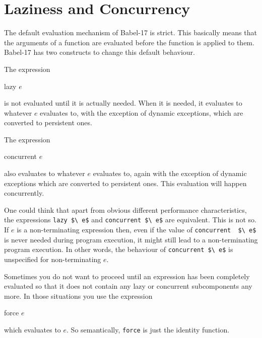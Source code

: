 \documentclass[11pt]{amsart}
\newcommand{\babelsrc}[1] {\lstinline!#1!}
\begin{document}
\section{Laziness and Concurrency}
The default evaluation mechanism of Babel-17 is strict. This basically means that the arguments of a function are evaluated before the function is applied to them. Babel-17 has two constructs to change this default behaviour. 

The expression
\begin{babellisting}
lazy $e$
\end{babellisting}
is not evaluated until it is actually needed. When it is needed, it evaluates to whatever $e$ evaluates to, with the exception of dynamic exceptions, which are converted to persistent ones.  

The expression
\begin{babellisting}
concurrent $e$
\end{babellisting}
also evaluates to whatever $e$ evaluates to, again with the exception of dynamic exceptions which are converted to persistent ones. This evaluation will happen concurrently.  

One could think that apart from obvious different performance characteristics, the expressions \babelsrc{lazy $\ e$} and \babelsrc{concurrent $\ e$} are equivalent. This is not so.
If $e$ is a non-terminating expression then, even if  the value of  \babelsrc{concurrent  $\ e$} is never needed during program execution, it might still lead to a non-terminating program execution. In other words, the behaviour of \babelsrc{concurrent $\ e$}  is unspecified for non-terminating $e$.

Sometimes you do not want to proceed until an expression has been completely evaluated so that it does not contain any lazy or concurrent subcomponents any more. In those situations you use the expression
\begin{babellisting}
force $e$
\end{babellisting}
which evaluates to $e$. So semantically, \babelsrc{force} is just the identity function. 
\end{document}

